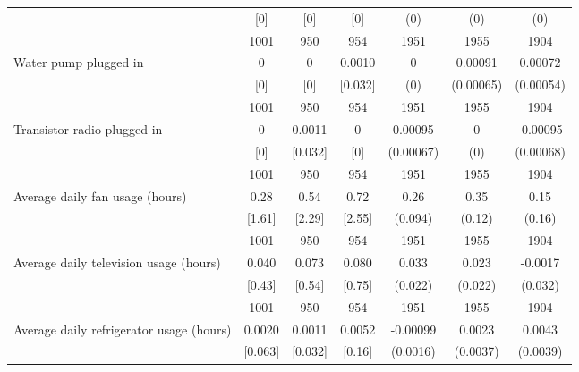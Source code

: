 \begin{table}[htbp]
\begin{tabular*}{1\hsize}{@{\hskip\tabcolsep\extracolsep\fill}l*{1}{cccccc}}
                                &      [0]&      [0]&      [0]&      (0)         &      (0)         &      (0)         \\
                                &     1001&      950&      954&     1951         &     1955         &     1904         \\
Water pump plugged in           &        0&        0&   0.0010&        0         &  0.00091         &  0.00072         \\
                                &      [0]&      [0]&  [0.032]&      (0)         &(0.00065)         &(0.00054)         \\
                                &     1001&      950&      954&     1951         &     1955         &     1904         \\
Transistor radio plugged in     &        0&   0.0011&        0&  0.00095         &        0         & -0.00095         \\
                                &      [0]&  [0.032]&      [0]&(0.00067)         &      (0)         &(0.00068)         \\
                                &     1001&      950&      954&     1951         &     1955         &     1904         \\
Average daily fan usage (hours) &     0.28&     0.54&     0.72&     0.26\sym{***}&     0.35\sym{***}&     0.15         \\
                                &   [1.61]&   [2.29]&   [2.55]&  (0.094)         &   (0.12)         &   (0.16)         \\
                                &     1001&      950&      954&     1951         &     1955         &     1904         \\
Average daily television usage (hours)&    0.040&    0.073&    0.080&    0.033         &    0.023         &  -0.0017         \\
                                &   [0.43]&   [0.54]&   [0.75]&  (0.022)         &  (0.022)         &  (0.032)         \\
                                &     1001&      950&      954&     1951         &     1955         &     1904         \\
Average daily refrigerator usage (hours)&   0.0020&   0.0011&   0.0052& -0.00099         &   0.0023         &   0.0043         \\
                                &  [0.063]&  [0.032]&   [0.16]& (0.0016)         & (0.0037)         & (0.0039)         \\

\end{tabular*}
\end{table}
